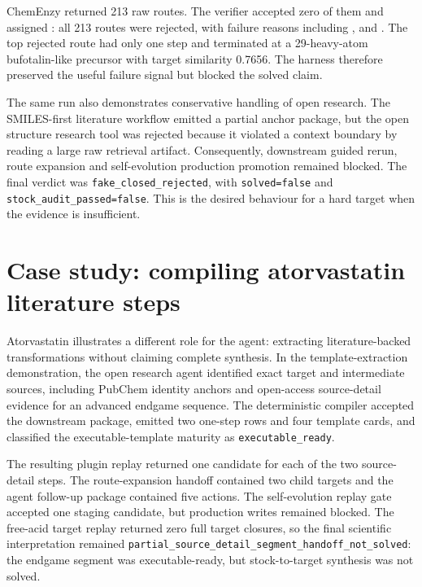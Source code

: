 \documentclass[11pt]{article}
\begin{document}
ChemEnzy returned 213 raw routes. The verifier accepted zero of them and assigned : all 213 routes were rejected, with failure reasons including ,  and . The top rejected route had only one step and terminated at a 29-heavy-atom bufotalin-like precursor with target similarity 0.7656. The harness therefore preserved the useful failure signal but blocked the solved claim.

The same run also demonstrates conservative handling of open research. The SMILES-first literature workflow emitted a partial anchor package, but the open structure research tool was rejected because it violated a context boundary by reading a large raw retrieval artifact. Consequently, downstream guided rerun, route expansion and self-evolution production promotion remained blocked. The final verdict was \texttt{fake\_closed\_rejected}, with \texttt{solved=false} and \texttt{stock\_audit\_passed=false}. This is the desired behaviour for a hard target when the evidence is insufficient.

\section*{Case study: compiling atorvastatin literature steps}

Atorvastatin illustrates a different role for the agent: extracting literature-backed transformations without claiming complete synthesis. In the template-extraction demonstration, the open research agent identified exact target and intermediate sources, including PubChem identity anchors and open-access source-detail evidence for an advanced endgame sequence. The deterministic compiler accepted the downstream package, emitted two one-step rows and four template cards, and classified the executable-template maturity as \texttt{executable\_ready}.

The resulting plugin replay returned one candidate for each of the two source-detail steps. The route-expansion handoff contained two child targets and the agent follow-up package contained five actions. The self-evolution replay gate accepted one staging candidate, but production writes remained blocked. The free-acid target replay returned zero full target closures, so the final scientific interpretation remained \texttt{partial\_source\_detail\_segment\_handoff\_not\_solved}: the endgame segment was executable-ready, but stock-to-target synthesis was not solved.
\end{document}
